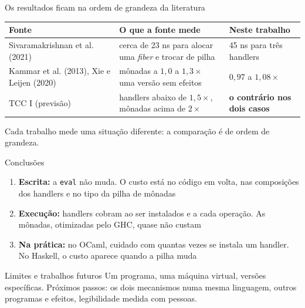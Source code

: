 \documentclass[aspectratio=169,10pt]{beamer}
\newcommand{\oc}[1]{\textcolor{ocamlc}{#1}}
\newcommand{\hs}[1]{\textcolor{haskellc}{#1}}
\begin{document}
\begin{frame}{Os resultados ficam na ordem de grandeza da literatura}
  \vspace{4pt}
  \begin{center}
  \renewcommand{\arraystretch}{1.25}
  \begin{tabular}{L{4.1cm}L{4.6cm}L{3.4cm}}
    \toprule
    \textbf{Fonte} & \textbf{O que a fonte mede} & \textbf{Neste trabalho} \\
    \midrule
    Sivaramakrishnan et al. (2021) & cerca de 23 ns para alocar uma \emph{fiber} e trocar de pilha & 45 ns para três handlers \\
    Kammar et al. (2013), Xie e Leijen (2020) & mônadas a $1{,}0$ a $1{,}3\times$ uma versão sem efeitos & $0{,}97$ a $1{,}08\times$ \\
    \midrule
    TCC I (previsão) & handlers abaixo de $1{,}5\times$, mônadas acima de $2\times$ & \hs{\textbf{o contrário nos dois casos}} \\
    \bottomrule
  \end{tabular}
  \end{center}
  \vspace{6pt}
  Cada trabalho mede uma situação diferente: a comparação é de ordem de grandeza.
\end{frame}

\begin{frame}{Conclusões}
  \begin{enumerate}
    \item \textbf{Escrita:} a \texttt{eval} não muda. O custo está no código em volta, nas composições dos \oc{handlers} e no tipo da pilha de \hs{mônadas}
    \item \textbf{Execução:} handlers cobram ao ser instalados e a cada operação. As mônadas, otimizadas pelo GHC, quase não custam
    \item \textbf{Na prática:} no OCaml, cuidado com quantas vezes se instala um handler. No Haskell, o custo aparece quando a pilha muda
  \end{enumerate}
  \vspace{8pt}
  \begin{block}{Limites e trabalhos futuros}
    Um programa, uma máquina virtual, versões específicas. Próximos passos: os dois mecanismos numa mesma linguagem, outros programas e efeitos, legibilidade medida com pessoas.
  \end{block}
\end{frame}
\end{document}
